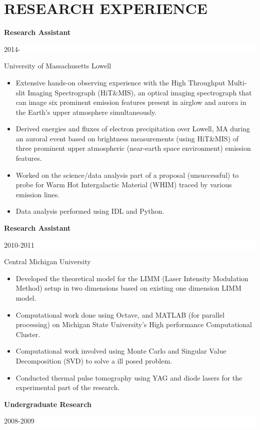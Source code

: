 \documentclass[paper=letter,fontsize=11pt]{scrartcl} %
\newcommand{\sepspace}{\vspace*{1em}}		%
\newcommand{\NewPart}[2]{\section*{\uppercase{#1} #2}}
\begin{document}
\NewPart{Research Experience}{}
\noindent \textbf{Research Assistant} \hfill      %
		\colorbox{White}{%
			\parbox{6em}{%
			\hfill\color{Black}2014-$\qquad$}} \par
{University of Massachusetts Lowell}{\begin{itemize}
\item{Extensive hands-on observing experience with the High Throughput Multi-slit Imaging Spectrograph (HiT\&MIS), an optical imaging spectrograph that can image six prominent emission features present in airglow and aurora in the Earth's upper atmosphere simultaneously.}
\item{Derived energies and fluxes of electron precipitation over Lowell, MA during an auroral event based on brightness measurements (using HiT\&MIS) of three prominent upper atmospheric (near-earth space environment) emission features.}
\item{Worked on the science/data analysis part of a proposal (unsuccessful) to probe for Warm Hot Intergalactic Material (WHIM) traced by various emission lines.}
\item{Data analysis performed using IDL and Python.}
\end{itemize}}
\sepspace
\noindent \textbf{Research Assistant} \hfill      %
		\colorbox{White}{%
			\parbox{6em}{%
			\hfill\color{Black}2010-2011}} \par
{Central Michigan University}{\begin{itemize}
\item{Developed the theoretical model for the LIMM (Laser Intensity Modulation Method) setup in two dimensions based on existing one dimension LIMM model.}
\item{Computational work done using Octave, and MATLAB (for parallel processing) on Michigan State University's High performance Computational Cluster.}
\item{Computational work involved using Monte Carlo and Singular Value Decomposition (SVD) to solve a ill posed problem.} 
\item{Conducted thermal pulse tomography using YAG and diode lasers for the experimental part of the research.}
\end{itemize}}
\sepspace
\noindent \textbf{Undergraduate Research} \hfill      %
		\colorbox{White}{%
			\parbox{6em}{%
			\hfill\color{Black}2008-2009}} \par
\end{document}
